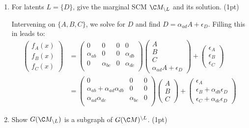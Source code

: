 \begin{enumerate}
\begin{gradedsolution}
	\end{gradedsolution}
	\item For latents $L=\{D\}$, give the marginal SCM $\C M_{\setminus L}$ and its solution. (1pt)
\begin{gradedsolution}
	Intervening on $\{A,B,C\}$, we solve for $D$ and find $D=\alpha_{ad} A + \epsilon_D$. Filling this in leads to:
	\begin{align*}
	\begin{pmatrix}
		f_A(x) \\ f_B(x) \\ f_C(x)
	\end{pmatrix}
	&= 
	\begin{pmatrix}
		0 & 0 & 0 & 0 \\
		\alpha_{ab} & 0 & 0 & \alpha_{db} \\
		0 & \alpha_{bc} & 0 & \alpha_{dc} \\
	\end{pmatrix}
	\begin{pmatrix}
		A \\ B \\ C \\ \alpha_{ad} A + \epsilon_D
	\end{pmatrix}
	+
	\begin{pmatrix}
		\epsilon_A \\ \epsilon_B \\ \epsilon_C
	\end{pmatrix} \\
		&= 
		\begin{pmatrix}
			0 & 0 & 0 \\
			\alpha_{ab}+\alpha_{ad}\alpha_{db} & 0 & 0 \\
			\alpha_{ad}\alpha_{dc} & \alpha_{bc} & 0 \\
		\end{pmatrix}
		\begin{pmatrix}
			A \\ B \\ C
		\end{pmatrix}
		+
		\begin{pmatrix}
			\epsilon_A \\ \epsilon_B +\alpha_{db}\epsilon_D\\ \epsilon_C + \alpha_{dc}\epsilon_D
		\end{pmatrix}
	\end{align*}
	
\end{gradedsolution}
	\item Show $G(\C M_{\setminus L})$ is a subgraph of $G(\C M)^{\setminus L}$. (1pt)
	\begin{gradedsolution}


\end{gradedsolution}
\end{enumerate}
